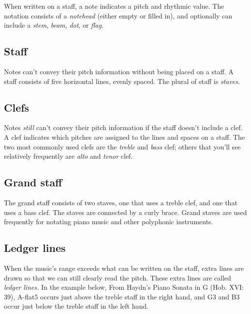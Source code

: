\documentclass{book}
\begin{document}
When written on a staff, a note indicates a pitch and rhythmic value. The
notation consists of a \emph{notehead} (either empty or filled in), and
optionally can include a \emph{stem}, \emph{beam}, \emph{dot}, or \emph{flag}.

\hypertarget{staff}{%
\subsection{Staff}\label{staff}}

Notes can't convey their pitch information without being placed on a staff. A
staff consists of five horizontal lines, evenly spaced. The plural of staff is
\emph{staves}.

\hypertarget{clefs-2}{%
\subsection{Clefs}\label{clefs-2}}

Notes \emph{still} can't convey their pitch information if the staff doesn't
include a clef. A clef indicates which pitches are assigned to the lines and
spaces on a staff. The two most commonly used clefs are the \emph{treble} and
\emph{bass} clef; others that you'll see relatively frequently are \emph{alto}
and \emph{tenor} clef.

\hypertarget{grand-staff}{%
\subsection{Grand staff}\label{grand-staff}}

The grand staff consists of two staves, one that uses a treble clef, and one
that uses a bass clef. The staves are connected by a curly brace. Grand staves
are used frequently for notating piano music and other polyphonic instruments.

\hypertarget{ledger-lines}{%
\subsection{Ledger lines}\label{ledger-lines}}

When the music's range exceeds what can be written on the staff, extra lines
are drawn so that we can still clearly read the pitch. These extra lines are
called \emph{ledger lines.} In the example below, From Haydn's Piano Sonata in
G (Hob. XVI: 39), A-flat5 occurs just above the treble staff in the right
hand, and G3 and B3 occur just below the treble staff in the left hand.
\end{document}
